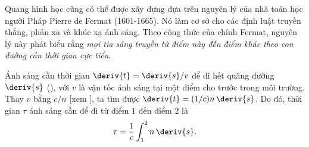 Quang hình học cũng có thể được xây dựng dựa trên nguyên lý của nhà toán học người Pháp Pierre de Fermat (1601-1665).
Nó làm cơ sở cho các định luật truyền thẳng, phản xạ và khúc xạ ánh sáng. Theo công thức của chính Fermat, nguyên lý này phát biểu rằng \textit{mọi tia sáng truyền từ điểm này đến điểm khác theo con đường cần thời gian cực tiểu}.

Ánh sáng cần thời gian $\deriv{t} = \deriv{s}/v$ để đi hết quãng đường $\deriv{s}$ (), với $v$ là vận tốc ánh sáng tại một điểm cho trước trong môi trường.
Thay $v$ bằng $c/n$ [xem ], ta tìm được $\deriv{t}=(1/c)n\,\deriv{s}$.
Do đó, thời gian $\tau$ ánh sáng cần để đi từ điểm $1$ đến điểm $2$ là
\begin{equation}\label{eq:16_51}
    \tau = \frac{1}{c} \int_1^2 n\, \deriv{s}.
\end{equation}

